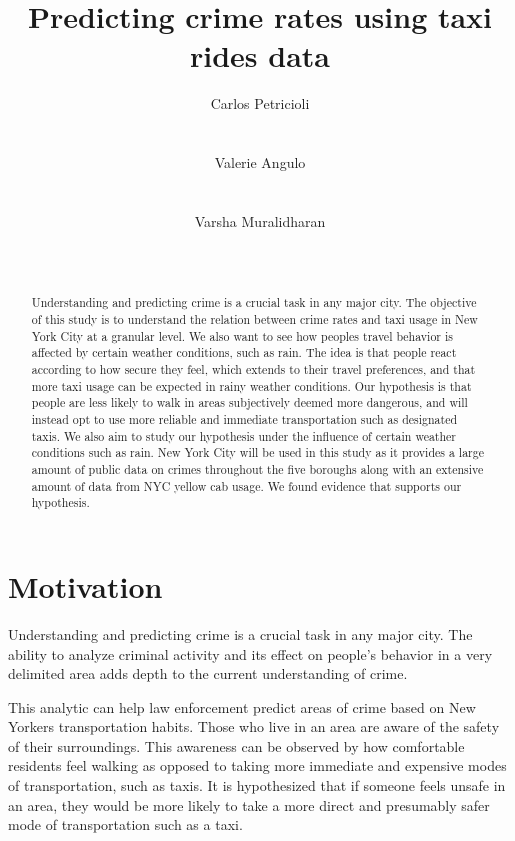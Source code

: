 \documentclass{sigkddExp}
\title{Predicting crime rates using taxi rides data}
\author{
\alignauthor Carlos Petricioli \\
       \affaddr{New York University}\\
       \affaddr{New York, USA}\\
       \email{petricioli@nyu.edu}
\alignauthor Valerie Angulo\\
       \affaddr{New York University}\\
       \affaddr{New York, USA}\\
       \email{vaa238@nyu.edu}
\alignauthor Varsha Muralidharan \\
       \affaddr{New York University}\\
       \affaddr{New York, USA}\\
       \email{vm1370@nyu.edu}
}
\begin{document}
\maketitle


\begin{abstract}

Understanding and predicting crime is a crucial task in any major city. The objective of this study is to understand the relation between crime rates and taxi usage in New York City at a granular level. We also want to see how peoples travel behavior is affected by certain weather conditions, such as rain. The idea is that people react according to how secure they feel, which extends to their travel preferences, and that more taxi usage can be expected in rainy weather conditions. 
Our hypothesis is that people are less likely to walk in areas subjectively deemed more dangerous, and will instead opt to use more reliable and immediate transportation such as designated taxis. We also aim to study our hypothesis under the influence of certain weather conditions such as rain. 
New York City will be used in this study as it provides a large amount of public data on crimes throughout the five boroughs along with an extensive amount of data from NYC yellow cab usage. 
We found evidence that supports our hypothesis.

\end{abstract}




\section{Motivation}

Understanding and predicting crime is a crucial task in any major city. 
The ability to analyze criminal activity and its effect on people's behavior in a very delimited area adds depth to the current understanding of crime.

This analytic can help law enforcement predict areas of crime based on New Yorkers transportation habits. Those who live in an area are aware of the safety of their surroundings. This awareness can be observed by how comfortable residents feel walking as opposed to taking more immediate and expensive modes of transportation, such as taxis. It is hypothesized that if someone feels unsafe in an area, they would be more likely to take a more direct and presumably safer mode of transportation such as a taxi. 
\end{document}
